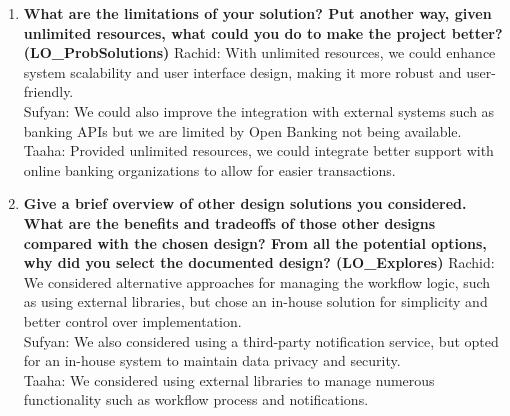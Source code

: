 \documentclass[12pt, titlepage]{article}
\begin{document}
\begin{enumerate}
  \item \textbf{What are the limitations of your solution? Put another way, given unlimited resources, what could you do to make the project better? (LO\_ProbSolutions)}  
  \newline
  Rachid: With unlimited resources, we could enhance system scalability and user interface design, making it more robust and user-friendly. \\
  Sufyan: We could also improve the integration with external systems such as banking APIs but we are limited by Open Banking not being available. \\
  Taaha: Provided unlimited resources, we could integrate better support with online banking organizations to allow for easier transactions. \\

  \item \textbf{Give a brief overview of other design solutions you considered. What are the benefits and tradeoffs of those other designs compared with the chosen design? From all the potential options, why did you select the documented design? (LO\_Explores)}  
  \newline
  Rachid: We considered alternative approaches for managing the workflow logic, such as using external libraries, but chose an in-house solution for simplicity and better control over implementation. \\
  Sufyan: We also considered using a third-party notification service, but opted for an in-house system to maintain data privacy and security. \\
  Taaha: We considered using external libraries to manage numerous functionality such as workflow process and notifications. \\
\end{enumerate}
\end{document}
